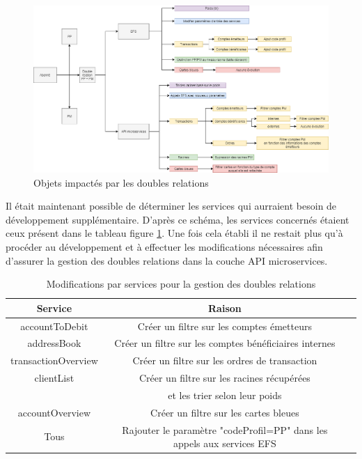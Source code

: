\begin{figure}[h!]
	\includegraphics[scale=0.45]{images/travailNeuflizeOBC/doubleRelation/doubleRelation.png}
	\centering
	\caption{Objets impactés par les doubles relations}
	\label{doubleRelation}
\end{figure}

\newpage

	Il était maintenant possible de déterminer les services qui aurraient besoin de développement supplémentaire. D'après ce schéma, les services concernés étaient ceux présent dans le tableau figure \ref{servicesDoubleRelation}. Une fois cela établi il ne restait plus qu'à procéder au développement et à effectuer les modifications nécessaires afin d'assurer la gestion des doubles relations dans la couche API microservices. \\ 
	
\begin{table}[h!]
	\center
	\begin{tabular}{| c | c | c |}
     \hline
     Service & Raison \\ \hline
     accountToDebit & Créer un filtre sur les comptes émetteurs \\ \hline
     addressBook & Créer un filtre sur les comptes bénéficiaires internes \\ \hline
     transactionOverview & Créer un filtre sur les ordres de transaction\\ \hline
     clientList & Créer un filtre sur les racines récupérées \\ & et les trier selon leur poids\\ \hline
     accountOverview & Créer un filtre sur les cartes bleues \\
     Tous & Rajouter le paramètre "codeProfil=PP" dans les appels aux services EFS \\ 
     \hline
	\end{tabular}
	\caption{Modifications par services pour la gestion des doubles relations}
	\label{servicesDoubleRelation}
\end{table}

